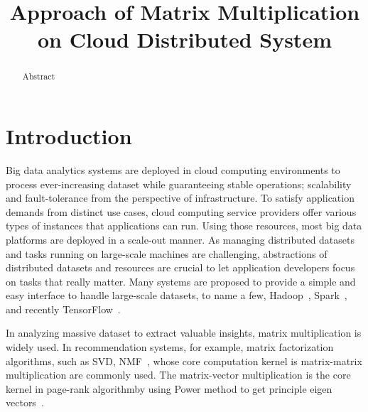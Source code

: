 \documentclass[10pt, conference, compsocconf]{IEEEtran}
\begin{document}

\title{Approach of Matrix Multiplication on Cloud Distributed System}


\author{
\and
{}
}

\maketitle

\begin{abstract}
Abstract
\end{abstract}

\IEEEpeerreviewmaketitle

\section{Introduction}\label{sec:intro}
Big data analytics systems are deployed in cloud computing environments to process ever-increasing dataset while guaranteeing stable operations; scalability and fault-tolerance from the perspective of infrastructure. To satisfy application demands from distinct use cases, cloud computing service providers offer various types of instances that applications can run. Using those resources, most big data platforms are deployed in a scale-out manner. As managing distributed datasets and tasks running on large-scale machines are challenging, abstractions of distributed datasets and resources are crucial to let application developers focus on tasks that really matter. Many systems are proposed to provide a simple and easy interface to handle large-scale datasets, to name a few, Hadoop~\cite{hadoop}, Spark~\cite{spark}, and recently TensorFlow~\cite{tensorflow}.

In analyzing massive dataset to extract valuable insights, matrix multiplication is widely used. In recommendation systems, for example, matrix factorization algorithms, such as SVD, NMF~\cite{nmf}, whose core computation kernel is matrix-matrix multiplication are commonly used. The matrix-vector multiplication is the core kernel in page-rank algorithmby using Power method to get principle eigen vectors~\cite{pagerank}.
\end{document}
